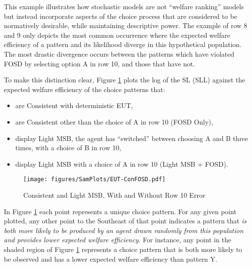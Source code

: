 \documentclass[../main.tex]{subfiles}
\begin{document}
This example illustrates how stochastic models are not \enquote{welfare ranking} models but instead incorporate aspects of the choice process that are considered to be normatively desirable, while maintaining descriptive power.
The example of row 8 and 9 only depicts the most common occurrence where the expected welfare efficiency of a pattern and its likelihood diverge in this hypothetical population.
The most drastic divergence occurs between the patterns which have violated FOSD by selecting option A in row 10, and those that have not.

To make this distinction clear, Figure \ref{fig:ConFOSD} plots the log of the SL (SLL) against the expected welfare efficiency of the choice patterns that:
\begin{itemize}
 \setlength\itemsep{-.5em}
	\item are Consistent with deterministic EUT,
	\item are Consistent other than the choice of A in row 10 (FOSD Only),
	\item display Light MSB, the agent has \enquote{switched} between choosing A and B three times, with a choice of B in row 10,
	\item display Light MSB with a choice of A in row 10 (Light MSB + FOSD).
\end{itemize}

\begin{figure}[h!]
	\caption{Consistent and Light MSB, With and Without Row 10 Error}
	\texttt{[image: figures/SamPlots/EUT-ConFOSD.pdf]}
	\label{fig:ConFOSD}
\end{figure}

In Figure \ref{fig:ConFOSD} each point represents a unique choice pattern.
For any given point plotted, any other point to the Southeast of that point indicates a pattern that \textit{is both more likely to be produced by an agent drawn randomly from this population and provides lower expected welfare efficiency.}
For instance, any point in the shaded region of Figure \ref{fig:ConFOSD} represents a choice pattern that is both more likely to be observed and has a lower expected welfare efficiency than pattern Y.
\end{document}
